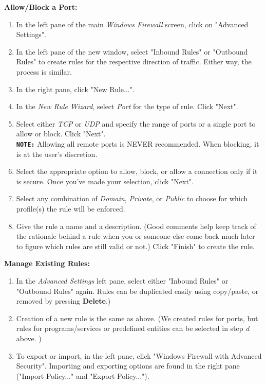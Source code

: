 \documentclass[12pt]{extarticle}
\begin{document}
\item \textbf{Allow/Block a Port:}
\begin{enumerate}
\item In the left pane of the main \textit{Windows Firewall} screen, click on "Advanced Settings". 
\item In the left pane of the new window, select "Inbound Rules" or "Outbound Rules" to create rules for the respective direction of traffic. Either way, the process is similar.
\item In the right pane, click "New Rule...".
\item In the \textit{New Rule Wizard}, select \textit{Port} for the type of rule. Click "Next".
\item Select either \textit{TCP} or \textit{UDP} and specify the range of ports or a single port to allow or block. Click "Next".\\
\hspace{10 mm} \textbf{\texttt{NOTE:} } Allowing all remote ports is NEVER recommended. When blocking, it is at the user's discretion.
\item Select the appropriate option to allow, block, or allow a connection only if it is secure. Once you've made your selection, click "Next".
\item Select any combination of \textit{Domain}, \textit{Private}, or \textit{Public} to choose for which profile(s) the rule will be enforced.
\item Give the rule a name and a description. (Good comments help keep track of the rationale behind a rule when you or someone else come back much later to figure which rules are still valid or not.) Click "Finish" to create the rule.
\end{enumerate}

\item \textbf{Manage Existing Rules:}
\begin{enumerate}
\item In the \textit{Advanced Settings} left pane, select either "Inbound Rules" or "Outbound Rules" again. Rules can be duplicated easily using copy/paste, or removed by pressing \textbf{Delete}.)
\item Creation of a new rule is the same as above. (We created rules for ports, but rules for programs/services or predefined entities can be selected in step \textit{d} above. )
\item  To export or import, in the left pane, click "Windows Firewall with Advanced Security". Importing and exporting options are found in the right pane ("Import Policy..." and "Export Policy...").
\end{enumerate}
\end{document}
